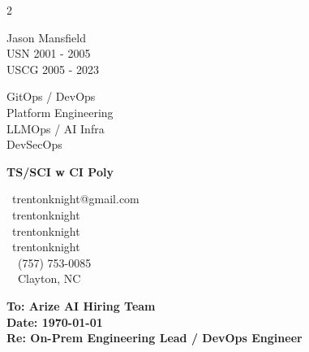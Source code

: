 \documentclass[10pt, a4paper]{article}
\begin{document}
\begin{paracol}{2}
\begin{leftcolumn}
    \noindent\colorbox{slateteal}{}
    \begin{flushright}
    Jason Mansfield\\
    USN 2001 - 2005\\
    USCG 2005 - 2023
    \end{flushright}

    \noindent\colorbox{slateteal}{}
    \begin{flushright}
    GitOps / DevOps\\
    Platform Engineering\\
    LLMOps / AI Infra\\
    DevSecOps
    \end{flushright}

    \noindent\colorbox{slateteal}{}
    \begin{flushright}
    \textbf{TS/SCI w CI Poly}
    \end{flushright}

    \vspace{4em}
    \begin{flushleft}
    \faEnvelope\ \scriptsize{trentonknight@gmail.com} \\
    \faGitlab\ \scriptsize{trentonknight} \\
    \faGithub\ \scriptsize{trentonknight} \\
    \faLinkedin\ \scriptsize{trentonknight} \\
    \faMobile\ \ (757) 753-0085 \\
    \faCompass\ \ Clayton, NC
    \end{flushleft}
\end{leftcolumn}

\begin{rightcolumn}
    \vspace{2.5em}
    \small
    \hspace{1.5em}
    \begin{minipage}{0.85\linewidth}
        \noindent \textbf{To: Arize AI Hiring Team} \\
        \textbf{Date: \today} \\
        \textbf{Re: On-Prem Engineering Lead / DevOps Engineer}

        \vspace{2.5em}


\end{minipage}
\end{rightcolumn}
\end{paracol}
\end{document}
